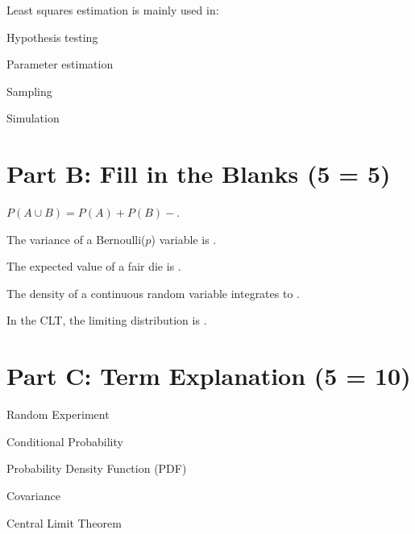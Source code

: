 \documentclass{USTBExam}
\begin{document}
\begin{question}
Least squares estimation is mainly used in:
\paren
\begin{choices}
\item Hypothesis testing
\item Parameter estimation
\item Sampling
\item Simulation
\end{choices}
\end{question}

\section{Part B: Fill in the Blanks (5  = 5)}

\begin{question}
$P(A\cup B)=P(A)+P(B)-$\fillin.
\end{question}

\begin{question}
The variance of a Bernoulli($p$) variable is \fillin.
\end{question}

\begin{question}
The expected value of a fair die is \fillin.
\end{question}

\begin{question}
The density of a continuous random variable integrates to \fillin.
\end{question}

\begin{question}
In the CLT, the limiting distribution is \fillin.
\end{question}

\section{Part C: Term Explanation (5  = 10)}

\begin{problem}Random Experiment\end{problem}
\begin{problem}Conditional Probability\end{problem}
\begin{problem}Probability Density Function (PDF)\end{problem}
\begin{problem}Covariance\end{problem}
\begin{problem}Central Limit Theorem\end{problem}
\end{document}
